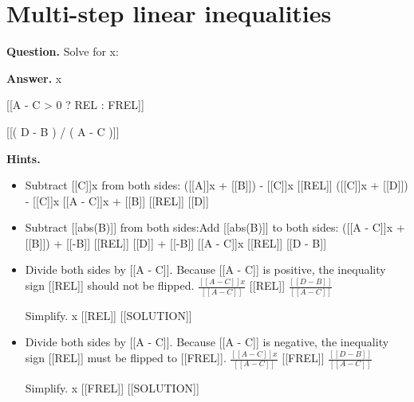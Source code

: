 \documentclass{article}
\begin{document}
\section*{Multi-step linear inequalities}
\textbf{Question.} Solve for x:

\textbf{Answer.} x
                    
                        [[A - C > 0 ? REL : FREL]]
                    
                    [[( D - B ) / ( A - C )]]

\textbf{Hints.}
\begin{itemize}
  \item Subtract [[C]]x from both sides:
                ([[A]]x + [[B]]) - [[C]]x [[REL]] ([[C]]x + [[D]]) - [[C]]x
                [[A - C]]x + [[B]] [[REL]] [[D]]
  \item Subtract [[abs(B)]] from both sides:Add [[abs(B)]] to both sides:
                ([[A - C]]x + [[B]]) + [[-B]] [[REL]] [[D]] + [[-B]]
                [[A - C]]x [[REL]] [[D - B]]
  \item Divide both sides by [[A - C]]. Because [[A - C]] is positive, the inequality sign [[REL]] should not be flipped.
                    $\frac{[[A - C]]x}{[[A - C]]}$ [[REL]] $\frac{[[D - B]]}{[[A - C]]}$
                
                
                    Simplify.
                    x [[REL]] [[SOLUTION]]
  \item Divide both sides by [[A - C]]. Because [[A - C]] is negative, the inequality sign [[REL]] must be flipped to [[FREL]].
                    $\frac{[[A - C]]x}{[[A - C]]}$ [[FREL]] $\frac{[[D - B]]}{[[A - C]]}$
                
                
                    Simplify.
                    x [[FREL]] [[SOLUTION]]
\end{itemize}
\end{document}
